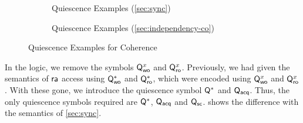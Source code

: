 \begin{figure*}[t]
  \begin{subfigure}{.5\textwidth}
    \centering
    
    \caption{Quiescence Examples (\textsection\ref{sec:sync})}
    \label{fig:q1}
  \end{subfigure}  
  \begin{subfigure}{.5\textwidth}
    \centering
    
    \caption{Quiescence Examples (\textsection\ref{sec:independency-co})}
    \label{fig:q2}
  \end{subfigure}
  \caption{Quiescence Examples for Coherence}
  \label{fig:q-co}
\end{figure*}
%   
%   

In the logic, we remove the symbols $\mathsf{Q}_{\mathsf{wo}}^{x}$ and $\mathsf{Q}_{\mathsf{ro}}^{x}$.
Previously, we had given the semantics of ${\mathsf{ra}}$ access using $\mathsf{Q}_{\mathsf{wo}}^{*}$ and
$\mathsf{Q}_{\mathsf{ro}}^{*}$, which were encoded using $\mathsf{Q}_{\mathsf{wo}}^{x}$ and $\mathsf{Q}_{\mathsf{ro}}^{x}$.  With these
gone, we introduce the quiescence symbol $\mathsf{Q}^{*}$ and $\mathsf{Q}_{\mathsf{acq}}$.  Thus, the only
quiescence symbols required are $\mathsf{Q}^{*}$, $\mathsf{Q}_{\mathsf{acq}}$ and $\mathsf{Q}_{\mathsf{sc}}$.
 shows the difference with the semantics of \textsection\ref{sec:sync}.


